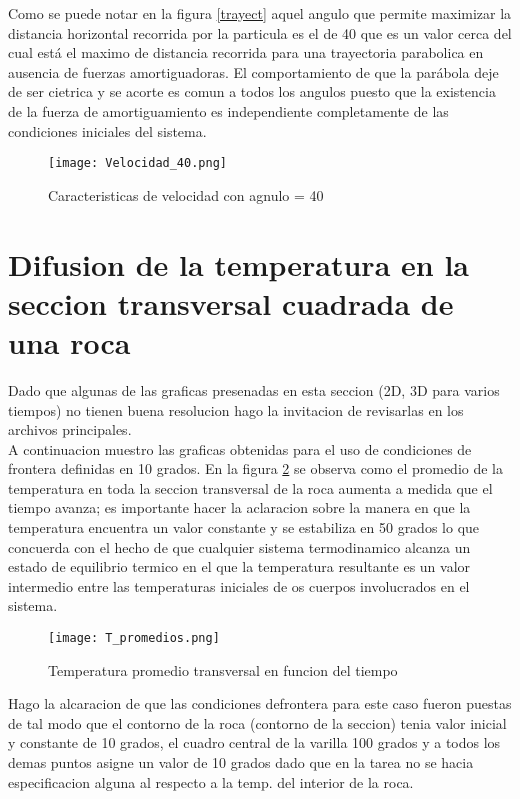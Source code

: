 \documentclass[13pts]{article}
\begin{document}
Como se puede notar en la figura \ref{trayect} aquel angulo que permite maximizar la distancia horizontal recorrida por la particula es el de 40 que es un valor cerca del cual está el maximo de distancia recorrida para una trayectoria parabolica en ausencia de fuerzas amortiguadoras. El comportamiento de que la parábola deje de ser cietrica y se acorte es comun a todos los angulos puesto que la existencia de la fuerza de amortiguamiento es independiente completamente de las condiciones iniciales del sistema.\\
\begin{figure}
	\texttt{[image: Velocidad\_40.png]}
	\caption[scale=0.000001]{Caracteristicas de velocidad con agnulo = 40}
	\label{40}
\end{figure}
\section{Difusion de la temperatura en la seccion transversal cuadrada de una roca}
Dado que algunas de las graficas presenadas en esta seccion (2D, 3D para varios tiempos) no tienen buena resolucion hago la invitacion de revisarlas en los archivos principales.\\
A continuacion muestro las graficas obtenidas para el uso de condiciones de frontera definidas en 10 grados. En la figura \ref{promedio} se observa como el promedio de la temperatura en toda la seccion transversal de la roca aumenta a medida que el tiempo avanza; es importante hacer la aclaracion sobre la manera en que la temperatura encuentra un valor constante y se estabiliza en 50 grados lo que concuerda con el hecho de que cualquier sistema termodinamico alcanza un estado de equilibrio termico en el que la temperatura resultante es un valor intermedio entre las temperaturas iniciales de os cuerpos involucrados en el sistema.\\
\begin{figure}
	\centering
	\texttt{[image: T\_promedios.png]}
	\caption{Temperatura promedio transversal en funcion del tiempo}
	\label{promedio}
\end{figure}
Hago la alcaracion de que las condiciones defrontera para este caso fueron puestas de tal modo que el contorno de la roca (contorno de la seccion) tenia valor inicial y constante de 10 grados, el cuadro central de la varilla 100 grados y a todos los demas puntos asigne un valor de 10 grados dado que en la tarea no se hacia especificacion alguna al respecto a la temp. del interior de la roca.\\
\end{document}
